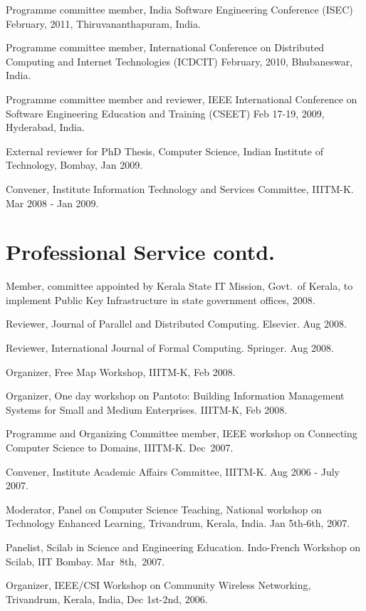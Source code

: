 \documentclass[11pt,margin,line]{res}
\begin{document}
\begin{resume}
Programme committee member, India Software Engineering
Conference (ISEC) February, 2011, Thiruvananthapuram, India.

Programme committee member, International Conference on
Distributed Computing and Internet Technologies (ICDCIT)
February, 2010, Bhubaneswar, India.

Programme committee member and reviewer, IEEE International
Conference on Software Engineering Education and Training
(CSEET) Feb 17-19, 2009, Hyderabad, India.


External reviewer for PhD Thesis, Computer Science, Indian
Institute of Technology, Bombay, Jan 2009.

Convener, Institute Information Technology and Services
Committee, IIITM-K.  Mar 2008 - Jan 2009.

\section{\sc Professional Service contd.}

Member, committee appointed by Kerala State IT Mission,
Govt.~of Kerala, to implement Public Key Infrastructure in
state government offices, 2008.


Reviewer, Journal of Parallel and Distributed Computing.
Elsevier. Aug 2008.

Reviewer, International Journal of Formal Computing.
Springer. Aug 2008.

Organizer, Free Map Workshop, IIITM-K, Feb 2008. 

Organizer, One day workshop on Pantoto: Building Information
Management Systems for Small and Medium Enterprises. 
IIITM-K, Feb 2008.

Programme and Organizing Committee member, IEEE workshop on
Connecting Computer Science to Domains, IIITM-K.  Dec~2007.

Convener, Institute Academic Affairs Committee, IIITM-K.
Aug 2006 - July 2007.

Moderator, Panel on Computer Science Teaching, National
workshop on Technology Enhanced Learning, Trivandrum,
Kerala, India.  Jan 5th-6th, 2007.

Panelist, Scilab in Science and Engineering Education.
Indo-French Workshop on Scilab, IIT Bombay.  Mar~8th,~2007.

Organizer, IEEE/CSI Workshop on Community Wireless
Networking, Trivandrum, Kerala, India, Dec 1st-2nd, 2006.


\end{resume}
\end{document}
